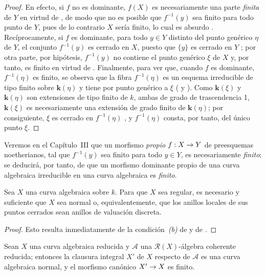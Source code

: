 \documentclass[oneside,10pt]{amsart}
\makeatletter
\newcommand{\ega@arrow}[2]{\mathchoice{#1}{#2}{#2}{#2}}
\renewcommand{\to}{\ega@arrow{\longrightarrow}{\rightarrow}}
\let\EGAOriginalLabel\label
\renewcommand{\label}[1]{\phantomsection\EGAOriginalLabel{#1}}
\makeatother
\begin{document}
\begin{proof}
En efecto, si $f$ no es dominante, $f(X)$ es necesariamente una parte \emph{finita} de $Y$ en virtud de , de modo que no es posible que $f^{-1}(y)$ sea finito para todo punto de $Y$, pues de lo contrario $X$ sería finito, lo cual es absurdo .
Recíprocamente, si $f$ es dominante, para todo $y\in Y$ distinto del punto genérico $\eta$ de $Y$, el conjunto $f^{-1}(y)$ es cerrado en $X$, puesto que $\{y\}$ es cerrado en $Y$ ;
por otra parte, por hipótesis, $f^{-1}(y)$ no contiene el punto genérico $\xi$ de $X$ y, por tanto, es finito en virtud de .
Finalmente, para ver que, cuando $f$ es dominante, $f^{-1}(\eta)$ es finito, se observa que la fibra $f^{-1}(\eta)$ es un esquema irreducible de tipo finito sobre $\boldsymbol{k}(\eta)$ y tiene por punto genérico a $\xi$ ( y ).
Como $\boldsymbol{k}(\xi)$ y $\boldsymbol{k}(\eta)$ son extensiones de tipo finito de $k$, ambas de grado de trascendencia 1, $\boldsymbol{k}(\xi)$ es necesariamente una extensión de grado finito de $\boldsymbol{k}(\eta)$; por consiguiente, $\xi$ es cerrado en $f^{-1}(\eta)$ , y $f^{-1}(\eta)$ consta, por tanto, del único punto $\xi$.
\end{proof}

Veremos en el Capítulo~III que un morfismo \emph{propio} $f:X\to Y$ de preesquemas noetherianos, tal que $f^{-1}(y)$ sea finito para todo $y\in Y$, es necesariamente \emph{finito};
se deducirá, por tanto, de  que un morfismo dominante propio de una curva algebraica irreducible en una curva algebraica es \emph{finito}.

\begin{corollary}[7.4.5]
\label{II.7.4.5-fr}
Sea $X$ una curva algebraica sobre $k$.
Para que $X$ sea regular, es necesario y suficiente que $X$ sea normal o, equivalentemente, que los anillos locales de sus puntos cerrados sean anillos de valuación discreta.
\end{corollary}

\begin{proof}
Esto resulta inmediatamente de la condición~\emph{(b)} de  y de .
\end{proof}

\begin{corollary}[7.4.6]
\label{II.7.4.6-fr}
Sean $X$ una curva algebraica reducida y $\mathcal{A}$ una $\mathcal{R}(X)$-álgebra coherente reducida;
entonces la clausura integral $X'$ de $X$ respecto de $\mathcal{A}$ \textup{} es una curva algebraica normal, y el morfismo canónico $X'\to X$ es finito.
\end{corollary}
\end{document}
